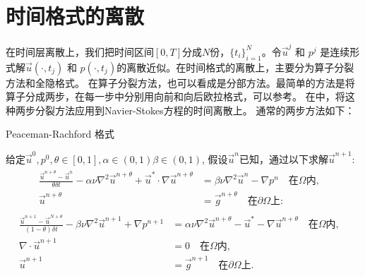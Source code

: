     \section{时间格式的离散}
        在时间层离散上，我们把时间区间$[0, T]$分成$N$份，$\{t_i\}_{i = 1}^N$。令$\vec{u}^j$ 和 $p^j$ 是连续形式解$\vec{u}(\cdot, t_j)$ 和 $p(\cdot, t_j)$的离散近似。在时间格式的离散上，主要分为算子分裂方法和全隐格式。
        在算子分裂方法，也可以看成是分部方法。最简单的方法是将算子分成两步，在每一步中分别用向前和向后欧拉格式，可以参考\cite{peaceman1955numerical}。
        在\cite{he2003two}中，将这种两步分裂方法应用到Navier-Stokes方程的时间离散上。
        通常的两步方法如下：
        \begin{algorithm}
            \caption{Peaceman-Rachford 格式}
            \begin{algorithmic}[1]
                给定$\vec{u}^0, p^0, \theta \in [0, 1], \alpha \in (0, 1) \beta \in (0, 1)$, 假设$\vec{u}^n$已知，通过以下求解$\vec{u}^{n + 1}$:
                \begin{eqnarray}
                    \begin{aligned}
                        \frac{\vec{u}^{n + \theta} - \vec{u}^n}{\theta \delta t} - \alpha \nu \nabla^2\vec{u}^{n + \theta} + \vec{u}^* \cdot \nabla\vec{u}^{n + \theta}
                        & = \beta \nu \nabla^2\vec{u}^n - \nabla p^n \quad \mbox {在} \Omega \mbox{内},& \\
                        \vec{u}^{n + \theta} & = \vec{g}^{n + \theta} \quad \mbox{在} \partial \Omega \mbox{上}:&                                 \label{eq::first_step_PR}
                    \end{aligned}
               \end{eqnarray}
               \begin{eqnarray}
                    \begin{aligned}
                        \frac{\vec{u}^{n + 1} - \vec{u}^{N + \theta}}{(1 - \theta)\delta t} - \beta \nu \nabla^2\vec{u}^{n + 1} + \nabla p^{n + 1}
                        & =  \alpha \nu \nabla^2 \vec{u}^{n + \theta} - \vec{u}^* - \nabla \vec{u}^{n + \theta} \quad \mbox{在} \Omega \mbox{内},&\\
                        \nabla \cdot \vec{u}^{n + 1} & =  0 \quad \mbox{在} \Omega \mbox{内},&\\
                        \vec{u}^{n + 1} & = \vec{g}^{n + 1} \quad \mbox{在} \partial \Omega 上.&
                        \label{eq::second_step_PR}
                    \end{aligned}
               \end{eqnarray}
            \end{algorithmic}
            \label{alg::Peaceman_Rachford}
         \end{algorithm}
